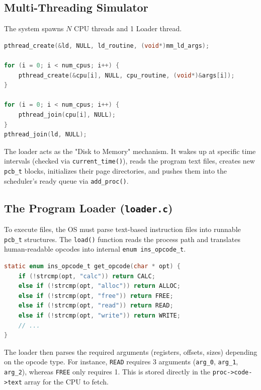 \subsection{Multi-Threading Simulator}
The system spawns $N$ CPU threads and 1 Loader thread.
\begin{lstlisting}[language=C, caption=Spawning OS Threads]
pthread_create(&ld, NULL, ld_routine, (void*)mm_ld_args);

for (i = 0; i < num_cpus; i++) {
    pthread_create(&cpu[i], NULL, cpu_routine, (void*)&args[i]);
}

for (i = 0; i < num_cpus; i++) {
    pthread_join(cpu[i], NULL);
}
pthread_join(ld, NULL);
\end{lstlisting}

\begin{theorybox}
The loader acts as the "Disk to Memory" mechanism. It wakes up at specific time intervals (checked via \texttt{current\_time()}), reads the program text files, creates new \texttt{pcb\_t} blocks, initializes their page directories, and pushes them into the scheduler's ready queue via \texttt{add\_proc()}. 
\end{theorybox}

\subsection{The Program Loader (\texttt{loader.c})}
To execute files, the OS must parse text-based instruction files into runnable \texttt{pcb\_t} structures. The \texttt{load()} function reads the process path and translates human-readable opcodes into internal \texttt{enum ins\_opcode\_t}.
\begin{lstlisting}[language=C, caption=Opcode Parsing]
static enum ins_opcode_t get_opcode(char * opt) {
    if (!strcmp(opt, "calc")) return CALC;
    else if (!strcmp(opt, "alloc")) return ALLOC;
    else if (!strcmp(opt, "free")) return FREE;
    else if (!strcmp(opt, "read")) return READ;
    else if (!strcmp(opt, "write")) return WRITE;
    // ...
}
\end{lstlisting}
The loader then parses the required arguments (registers, offsets, sizes) depending on the opcode type. For instance, \texttt{READ} requires 3 arguments (\texttt{arg\_0}, \texttt{arg\_1}, \texttt{arg\_2}), whereas \texttt{FREE} only requires 1. This is stored directly in the \texttt{proc->code->text} array for the CPU to fetch.
